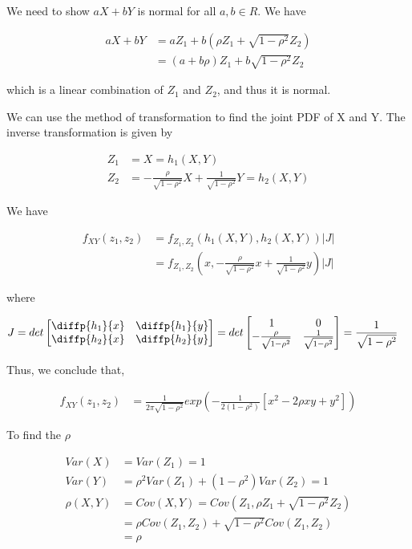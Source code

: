 \documentclass[11pt]{article} %
\begin{document}
We need to show $aX+bY$ is normal for all $a,b \in R$. We have

\begin{align*}
	aX + bY &= a Z_1 + b(\rho Z_1 + \sqrt{1- \rho^2} Z_2) \\
	&= (a + b\rho) Z_1 + b \sqrt{1- \rho^2} Z_2
\end{align*}

which is a linear combination of $Z_1$ and $Z_2$, and thus it is normal.


We can use the method of transformation to find the joint PDF of X and Y. The inverse transformation is given by

\begin{align*}
	Z_1 &= X = h_1(X, Y) \\
	Z_2 &= -\frac{\rho}{\sqrt{1-\rho^2}} X + \frac{1}{\sqrt{1-\rho^2}} Y = h_2(X, Y)
\end{align*}

We have

\begin{align*}
	f_{XY}(z_1, z_2) &= f_{Z_1, Z_2} (h_1(X, Y), h_2(X, Y)) |J|\\
	&= f_{Z_1, Z_2} (x, -\frac{\rho}{\sqrt{1-\rho^2}} x + \frac{1}{\sqrt{1-\rho^2}} y) |J|
\end{align*}

where 

\begin{align*}
	J &= det \begin{bmatrix}
		\diffp{h_1}{x} & \diffp{h_1}{y} \\
		\diffp{h_2}{x} & \diffp{h_2}{y}
	\end{bmatrix} = det \begin{bmatrix}
	1 & 0 \\
	-\frac{\rho}{\sqrt{1-\rho^2}} & \frac{1}{\sqrt{1-\rho^2}}
\end{bmatrix} = \frac{1}{\sqrt{1-\rho^2}}
\end{align*}

Thus, we conclude that,

\begin{align*}
	f_{XY}(z_1, z_2) &= \frac{1}{2 \pi \sqrt{1-\rho^2}} exp \left( -\frac{1}{2 (1- \rho^2)} [x^2 -2 \rho xy + y^2] \right)
\end{align*}


To find the $\rho$

\begin{align*}
	Var(X) &= Var(Z_1) =1 \\
	Var(Y) &= \rho^2 Var(Z_1) + (1- \rho^2) Var(Z_2) = 1 \\
	\rho(X,Y) &= Cov(X, Y) = Cov(Z_1, \rho Z_1 + \sqrt{1-\rho^2} Z_2) \\
	&= \rho Cov(Z_1, Z_2) + \sqrt{1-\rho^2} Cov(Z_1, Z_2) \\
	&= \rho
\end{align*}
\end{document}
